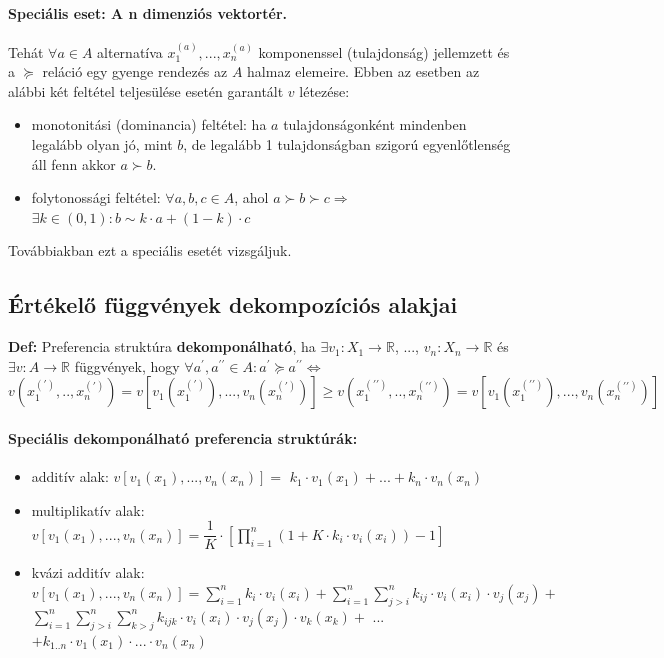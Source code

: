 \documentclass[a4paper,12pt]{article}
\begin{document}
\paragraph{Speciális eset: A n dimenziós vektortér. } Tehát $\forall a \in A$ alternatíva $x^{(a)}_1, ... , x^{(a)}_n$ komponenssel (tulajdonság) jellemzett és a $\succeq$ reláció egy gyenge rendezés az $A$ halmaz elemeire. Ebben az esetben az alábbi két feltétel teljesülése esetén garantált $v$ létezése: 

\begin{itemize}
\item monotonitási (dominancia) feltétel: ha $a$ tulajdonságonként mindenben legalább olyan jó, mint $b$, de legalább 1 tulajdonságban szigorú egyenlőtlenség áll fenn akkor $a \succ b$.
\item folytonossági feltétel: $\forall a,b,c \in A$, ahol $a \succ b \succ c \Rightarrow$  $\exists k \in (0,1): b \sim k \cdot a + (1-k) \cdot c$
\end{itemize}
Továbbiakban ezt a speciális esetét vizsgáljuk.

\subsection{Értékelő függvények dekompozíciós alakjai}

\textbf{Def: } Preferencia struktúra \textbf{dekomponálható}, ha $\exists v_1: X_1 \rightarrow \mathbb{R}$, ..., $v_n: X_n \rightarrow \mathbb{R}$ és $\exists v: A \rightarrow \mathbb{R}$ függvények, hogy $\forall a^\prime, a^{\prime\prime} \in A: a^\prime  \succeq  a^{\prime\prime} \Leftrightarrow $
\begin{equation}
v(x^{(\prime)}_1, .., x^{(\prime)}_n)=v[v_1(x^{(\prime)}_1), ..., v_n(x^{(\prime)}_n)] \geq v(x^{(\prime\prime)}_1, .., x^{(\prime\prime)}_n)=v[v_1(x^{(\prime\prime)}_1), ..., v_n(x^{(\prime\prime)}_n)]
\end{equation}

\paragraph{Speciális dekomponálható preferencia struktúrák:}
\begin{itemize}
\item additív alak: $v[v_1(x_1), ..., v_n(x_n)] = $ $k_1 \cdot v_1(x_1) + ... + k_n \cdot v_n(x_n)$
\item multiplikatív alak: $v[v_1(x_1), ..., v_n(x_n)] = \dfrac{1}{K} \cdot [ \prod_{i=1}^n ( 1 + K \cdot k_i \cdot v_i(x_i)) - 1 ]$
\item kvázi additív alak: $v[v_1(x_1), ..., v_n(x_n)] = \sum_{i=1}^n k_i \cdot v_i(x_i)+
\sum_{i=1}^n \sum_{j>i}^n k_{ij} \cdot v_i(x_i) \cdot v_j(x_j) +$
$\sum_{i=1}^n \sum_{j>i}^n \sum_{k>j}^n k_{ijk} \cdot v_i(x_i) \cdot v_j(x_j) \cdot v_k(x_k) +$ ... 
$+k_{1..n} \cdot v_1(x_1) \cdot ... \cdot v_n(x_n) $
\end{itemize}
\end{document}
